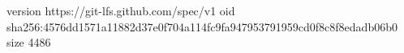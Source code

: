 version https://git-lfs.github.com/spec/v1
oid sha256:4576dd1571a11882d37e0f704a114fc9fa947953791959cd0f8c8f8edadb06b0
size 4486

